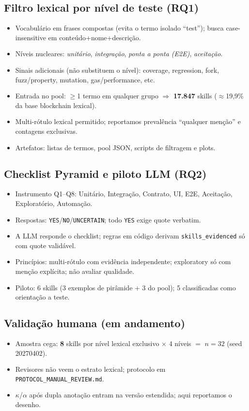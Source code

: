 \documentclass[10pt,conference]{IEEEtran}
\begin{document}
\subsection{Filtro lexical por nível de teste (RQ1)}
\begin{itemize}[leftmargin=*,itemsep=1pt]
\item Vocabulário em frases compostas (evita o termo isolado ``test''); busca case-insensitive em conteúdo+nome+descrição.
\item Níveis nucleares: \emph{unitário}, \emph{integração}, \emph{ponta a ponta (E2E)}, \emph{aceitação}.
\item Sinais adicionais (não substituem o nível): coverage, regression, fork, fuzz/property, mutation, gas/performance, etc.
\item Entrada no pool: $\geq$1 termo em qualquer grupo $\Rightarrow$ \textbf{17.847} skills ($\approx$19,9\% da base blockchain lexical).
\item Multi-rótulo lexical permitido; reportamos prevalência ``qualquer menção'' e contagens exclusivas.
\item Artefatos: listas de termos, pool JSON, scripts de filtragem e plots.
\end{itemize}

\subsection{Checklist Pyramid e piloto LLM (RQ2)}
\begin{itemize}[leftmargin=*,itemsep=1pt]
\item Instrumento Q1--Q8: Unitário, Integração, Contrato, UI, E2E, Aceitação, Exploratório, Automação.
\item Respostas: \texttt{YES}/\texttt{NO}/\texttt{UNCERTAIN}; todo \texttt{YES} exige quote verbatim.
\item A LLM responde o checklist; regras em código derivam \texttt{skills\_evidenced} só com quote validável.
\item Princípios: multi-rótulo com evidência independente; exploratory só com menção explícita; não avaliar qualidade.
\item Piloto: 6 skills (3 exemplos de pirâmide + 3 do pool); 5 classificadas como orientação a teste.
\end{itemize}

\subsection{Validação humana (em andamento)}
\begin{itemize}[leftmargin=*,itemsep=1pt]
\item Amostra cega: \textbf{8} skills por nível lexical exclusivo $\times$ 4 níveis $=$ \textbf{$n{=}32$} (seed 20270402).
\item Revisores não veem o estrato lexical; protocolo em \texttt{PROTOCOL\_MANUAL\_REVIEW.md}.
\item $\kappa$/$\alpha$ após dupla anotação entram na versão estendida; aqui reportamos o desenho.
\end{itemize}
\end{document}

